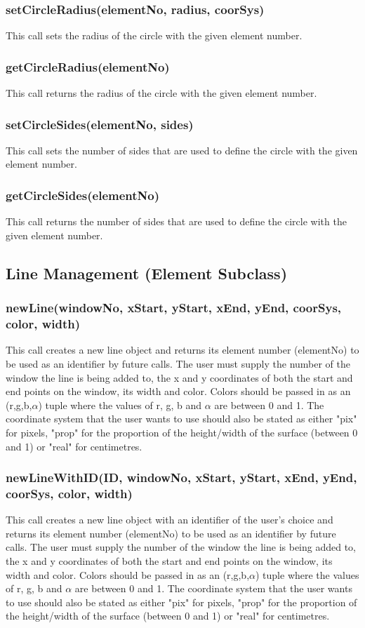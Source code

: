 \documentclass{acm_proc_article-sp}
\begin{document}
\subsubsection{setCircleRadius(elementNo, radius, coorSys)}
This call sets the radius of the circle with the given element number.
\subsubsection{getCircleRadius(elementNo)}
This call returns the radius of the circle with the given element number.
\subsubsection{setCircleSides(elementNo, sides)}
This call sets the number of sides that are used to define the circle with the given element number.
\subsubsection{getCircleSides(elementNo)}
This call returns the number of sides that are used to define the circle with the given element number.
\subsection{Line Management (Element Subclass)}
\subsubsection{newLine(windowNo, xStart, yStart, xEnd, yEnd, coorSys, color, width)}
This call creates a new line object and returns its element number (elementNo) to be used as an identifier by future calls. The user must supply the number of the window the line is being added to, the x and y coordinates of both the start and end points on the window, its width and color. Colors should be passed in as an (r,g,b,$\alpha$) tuple where the values of r, g, b and $\alpha$ are between 0 and 1. The coordinate system that the user wants to use should also be stated as either "pix" for pixels, "prop" for the proportion of the height/width of the surface (between 0 and 1) or "real" for centimetres.
\subsubsection{newLineWithID(ID, windowNo, xStart, yStart, xEnd, yEnd, coorSys, color, width)}
This call creates a new line object with an identifier of the user's choice and returns its element number (elementNo) to be used as an identifier by future calls. The user must supply the number of the window the line is being added to, the x and y coordinates of both the start and end points on the window, its width and color. Colors should be passed in as an (r,g,b,$\alpha$) tuple where the values of r, g, b and $\alpha$ are between 0 and 1. The coordinate system that the user wants to use should also be stated as either "pix" for pixels, "prop" for the proportion of the height/width of the surface (between 0 and 1) or "real" for centimetres.
\end{document}
